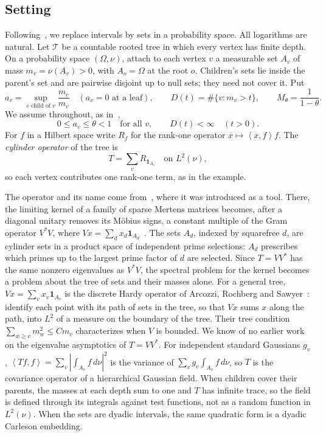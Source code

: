 \documentclass[11pt]{article}
\theoremstyle{definition}
\theoremstyle{remark}
\newcommand{\one}{\mathbf 1}
\newcommand{\cyl}{\mathcal T}
\newcommand{\inner}[2]{\left\langle #1,#2\right\rangle}
\begin{document}
\subsection{Setting}
Following~\cite{K26}, we replace intervals by sets in a probability
space. All logarithms are natural. Let $\cyl$ be a countable rooted tree in which
every vertex has finite depth. On a probability space $(\Omega,\nu)$,
attach to each vertex $v$ a measurable set $A_v$ of mass $m_v=\nu(A_v)>0$,
with $A_o=\Omega$ at the root $o$. Children's sets lie inside the parent's
set and are pairwise disjoint up to null sets; they need not cover it. Put
\[
 a_v=\sup_{c\text{ child of }v}\frac{m_c}{m_v}\quad(a_v=0\text{ at a leaf}),
 \qquad D(t)=\#\{v:m_v>t\},\qquad M_\theta=\frac1{1-\theta}.
\]
We assume throughout, as in~\cite{K26},
\begin{equation}\label{eq:tree}
 0\le a_v\le\theta<1\quad\text{for all }v,\qquad D(t)<\infty\quad(t>0).
\end{equation}
For $f$ in a Hilbert space write $R_f$ for the rank-one operator
$x\mapsto\inner{x}{f}f$. The \emph{cylinder operator} of the tree is
\[
 T=\sum_{v}R_{\one_{A_v}}\quad\text{on }L^2(\nu),
\]
so each vertex contributes one rank-one term, as in the example.

The operator and its name come from~\cite[Section~3]{K26}, where it was
introduced as a tool. There, the limiting kernel of a family of sparse
Mertens matrices becomes, after a diagonal unitary removes its M\"obius
signs, a constant multiple of the Gram operator $V^*V$, where
$Vx=\sum_dx_d\one_{A_d}$~\cite[eq.~(9)]{K26}. The sets $A_d$, indexed by
squarefree $d$, are cylinder sets in a product space of independent
prime selections: $A_d$ prescribes which primes up to the largest prime
factor of $d$ are selected. Since $T=VV^*$ has the same nonzero
eigenvalues as $V^*V$, the spectral problem for the kernel becomes a
problem about the tree of sets and their masses alone. For a general
tree, $Vx=\sum_vx_v\one_{A_v}$ is the discrete Hardy operator of Arcozzi,
Rochberg and Sawyer~\cite{ARS}: identify each point with its path of sets
in the tree, so that $Vx$ sums $x$ along the path, into $L^2$ of a measure
on the boundary of the tree. Their tree condition
$\sum_{w\ge v}m_w^2\le Cm_v$ characterizes when $V$ is bounded. We know of
no earlier work on the eigenvalue asymptotics of $T=VV^*$. For independent standard Gaussians
$g_v$, $\inner{Tf}{f}=\sum_v|\int_{A_v}f\,d\nu|^2$ is the variance of
$\sum_vg_v\int_{A_v}f\,d\nu$, so $T$ is the covariance operator of a
hierarchical Gaussian field. When children cover their parents, the
masses at each depth sum to one and $T$ has infinite trace, so the field
is defined through its
integrals against test functions, not as a random function in
$L^2(\nu)$. When the sets are dyadic intervals, the
same quadratic form is a dyadic Carleson embedding.
\end{document}
